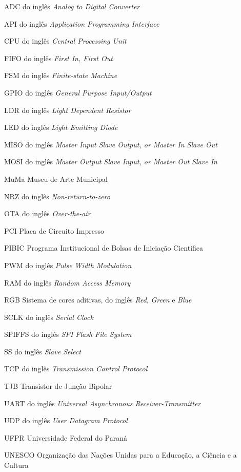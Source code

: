 \begin{siglas}
    \item[ADC] do inglês \emph{Analog to Digital Converter}
    \item[API] do inglês \emph{Application Programming Interface}
    \item[CPU] do inglês \emph{Central Processing Unit}
    \item[FIFO] do inglês \emph{First In, First Out}
    \item[FSM] do inglês \emph{Finite-state Machine}
    \item[GPIO] do inglês \emph{General Purpose Input/Output}
    \item[LDR] do inglês \emph{Light Dependent Resistor}
    \item[LED] do inglês \emph{Light Emitting Diode}
    \item[MISO] do inglês \emph{Master Input Slave Output, or Master In Slave Out}
    \item[MOSI] do inglês \emph{Master Output Slave Input, or Master Out Slave In}
    \item[MuMa] Museu de Arte Municipal
    \item[NRZ] do inglês \emph{Non-return-to-zero}
    \item[OTA] do inglês \emph{Over-the-air}
    \item[PCI] Placa de Circuito Impresso
    \item[PIBIC] Programa Institucional de Bolsas de Iniciação Científica
    \item[PWM] do inglês \emph{Pulse Width Modulation}
    \item[RAM] do inglês \emph{Random Access Memory}
    \item[RGB] Sistema de cores aditivas, do inglês \emph{Red}, \emph{Green} e \emph{Blue}
    \item[SCLK] do inglês \emph{Serial Clock}
    \item[SPIFFS] do inglês \emph{SPI Flash File System}
    \item[SS] do inglês \emph{Slave Select}
    \item[TCP] do inglês \emph{Transmission Control Protocol}
    \item[TJB] Transistor de Junção Bipolar
    \item[UART] do inglês \emph{Universal Asynchronous Receiver-Transmitter}
    \item[UDP] do inglês \emph{User Datagram Protocol}
    \item[UFPR] Universidade Federal do Paraná
    \item[UNESCO] Organização das Nações Unidas para a Educação, a Ciência e a Cultura
\end{siglas}

